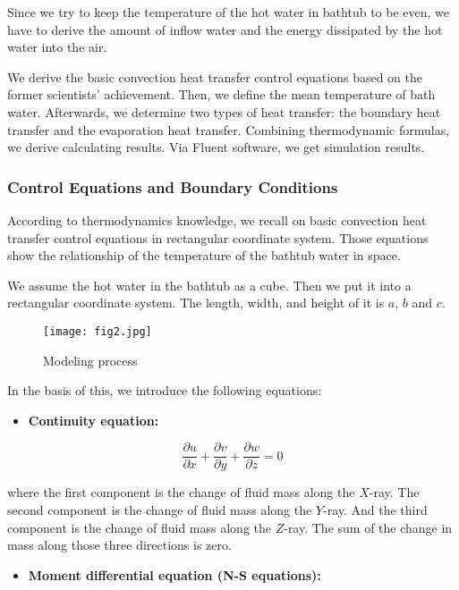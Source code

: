 \documentclass{mcmthesis}
\begin{document}
Since we try to keep the temperature of the hot water in bathtub to be even, 
we have to derive the amount of inflow water and the energy dissipated by the 
hot water into the air.

We derive the basic convection heat transfer control equations based on the 
former scientists’ achievement. Then, we define the mean temperature of bath 
water. Afterwards, we determine two types of heat transfer: the boundary heat 
transfer and the evaporation heat transfer. Combining thermodynamic formulas, 
we derive calculating results. Via Fluent software, we get simulation results.

\subsubsection{Control Equations and Boundary Conditions}

According to thermodynamics knowledge, we recall on basic convection
heat transfer control equations in rectangular coordinate system. Those
equations show the relationship of the temperature of the bathtub water in space.

We assume the hot water in the bathtub as a cube. Then we put it into a
rectangular coordinate system. The length, width, and height of it is $a,\, b$ 
and $c$.

\begin{figure}[h] 
\centering
\texttt{[image: fig2.jpg]}
\caption{Modeling process} \label{fig2}
\end{figure}

In the basis of this, we introduce the following equations:

\begin{itemize}
\item {\bf Continuity equation:}
\end{itemize}

\begin{equation} \label{eq1}
\frac{\partial u}{\partial x} + \frac{\partial v}{\partial y} +
\frac{\partial w}{\partial z} = 0
\end{equation}

\noindent where the first component is the change of fluid mass along the $X$-ray. 
The second component is the change of fluid mass along the $Y$-ray. And the third 
component is the change of fluid mass along the $Z$-ray. The sum of the change in 
mass along those three directions is zero.

\begin{itemize}
\item {\bf Moment differential equation (N-S equations):}
\end{itemize}
\end{document}
